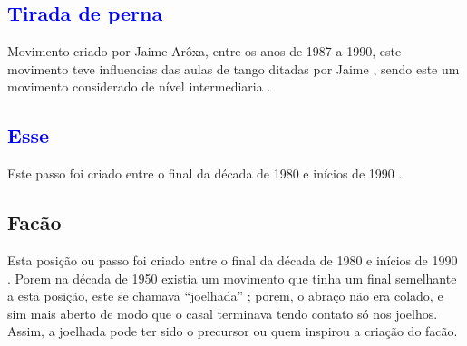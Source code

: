 \subsection{\textcolor{blue}{Tirada de perna}}
Movimento criado por Jaime Arôxa, entre os anos de 1987 a 1990,
este movimento teve influencias das aulas de tango ditadas por Jaime \cite{EntrevistaJaimeAroxa1},
sendo este um movimento considerado de nível intermediaria \cite[pp. 144]{perna2002samba}.


\subsection{\textcolor{blue}{Esse}}
Este passo foi  criado entre o final da década de 1980 e inícios de 1990  \cite[pp. 143]{perna2002samba}.

\subsection{Facão}
\label{subsec:desc:passo:facao}

\caracterpostura{\CheckedItem}{\NoCheckedItem}
Esta posição ou passo foi  criado entre o final da década de 1980 e inícios de 1990  \cite[pp. 143]{perna2002samba}.
Porem na década de 1950 existia um movimento que tinha um final semelhante a esta posição, 
este se chamava ``joelhada'' \cite[pp. 160]{fornaciari1950aprender};
porem, o abraço  não era colado,
e sim mais aberto de modo que o casal terminava tendo contato só nos joelhos.
Assim, a joelhada pode ter sido o precursor ou quem inspirou a criação do facão.

